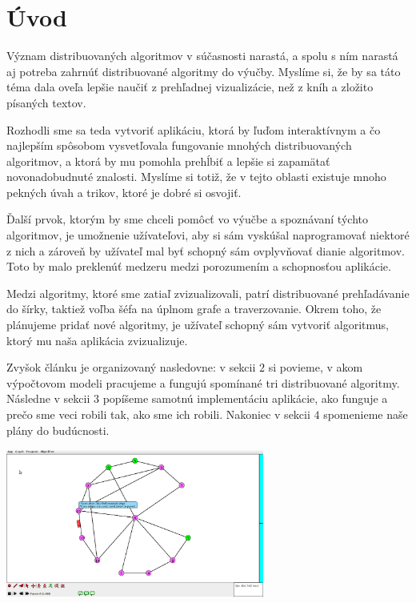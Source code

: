 \section{Úvod}

Význam distribuovaných algoritmov v súčasnosti narastá, a spolu s ním narastá aj potreba
zahrnúť distribuované algoritmy do výučby. Myslíme si, že by sa táto téma dala oveľa lepšie naučiť
z prehľadnej vizualizácie, než z kníh a zložito písaných textov.

Rozhodli sme sa teda vytvoriť aplikáciu, ktorá by ľuďom interaktívnym a čo najlepším spôsobom
vysvetľovala fungovanie mnohých distribuovaných algoritmov, a ktorá by mu pomohla prehĺbiť a lepšie si zapamätať
novonadobudnuté znalosti. Myslíme si totiž, že v tejto oblasti existuje mnoho pekných úvah a trikov,
ktoré je dobré si osvojiť. 

Ďalší prvok, ktorým by sme chceli pomôcť vo výučbe a spoznávaní týchto algoritmov, je umožnenie užívateľovi, 
aby si sám vyskúšal naprogramovať niektoré z nich a zároveň by užívateľ mal byť schopný sám
ovplyvňovať dianie algoritmov. Toto by malo preklenúť medzeru medzi porozumením a schopnosťou
aplikácie.

Medzi algoritmy, ktoré sme zatiaľ zvizualizovali, patrí distribuované prehľadávanie do šírky,
taktiež voľba šéfa na úplnom grafe a traverzovanie. Okrem toho, že plánujeme pridať nové 
algoritmy, je užívateľ schopný sám vytvoriť algoritmus, ktorý mu naša aplikácia zvizualizuje.

Zvyšok článku je organizovaný nasledovne: v sekcii $2$ si povieme, v akom výpočtovom modeli
pracujeme a fungujú spomínané tri distribuované algoritmy. 
Následne v sekcii $3$ popíšeme samotnú implementáciu aplikácie, ako
funguje a prečo sme veci robili tak, ako sme ich robili. Nakoniec v sekcii $4$ spomenieme naše plány do budúcnosti.

\noindent
\includegraphics[width=8.5cm]{DFS.png}